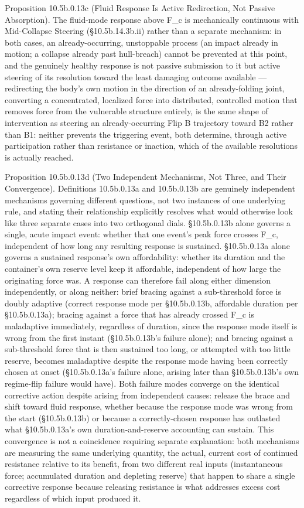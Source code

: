 \documentclass[
]{article}
\begin{document}
Proposition 10.5b.0.13c (Fluid Response Is Active Redirection, Not
Passive Absorption). The fluid-mode response above F\_c is mechanically
continuous with Mid-Collapse Steering (§10.5b.14.3b.ii) rather than a
separate mechanism: in both cases, an already-occurring, unstoppable
process (an impact already in motion; a collapse already past
hull-breach) cannot be prevented at this point, and the genuinely
healthy response is not passive submission to it but active steering of
its resolution toward the least damaging outcome available ---
redirecting the body's own motion in the direction of an already-folding
joint, converting a concentrated, localized force into distributed,
controlled motion that removes force from the vulnerable structure
entirely, is the same shape of intervention as steering an
already-occurring Flip B trajectory toward B2 rather than B1: neither
prevents the triggering event, both determine, through active
participation rather than resistance or inaction, which of the available
resolutions is actually reached.

Proposition 10.5b.0.13d (Two Independent Mechanisms, Not Three, and
Their Convergence). Definitions 10.5b.0.13a and 10.5b.0.13b are
genuinely independent mechanisms governing different questions, not two
instances of one underlying rule, and stating their relationship
explicitly resolves what would otherwise look like three separate cases
into two orthogonal dials. §10.5b.0.13b alone governs a single, acute
impact event: whether that one event's peak force crosses F\_c,
independent of how long any resulting response is sustained.
§10.5b.0.13a alone governs a sustained response's own affordability:
whether its duration and the container's own reserve level keep it
affordable, independent of how large the originating force was. A
response can therefore fail along either dimension independently, or
along neither: brief bracing against a sub-threshold force is doubly
adaptive (correct response mode per §10.5b.0.13b, affordable duration
per §10.5b.0.13a); bracing against a force that has already crossed F\_c
is maladaptive immediately, regardless of duration, since the response
mode itself is wrong from the first instant (§10.5b.0.13b's failure
alone); and bracing against a sub-threshold force that is then sustained
too long, or attempted with too little reserve, becomes maladaptive
despite the response mode having been correctly chosen at onset
(§10.5b.0.13a's failure alone, arising later than §10.5b.0.13b's own
regime-flip failure would have). Both failure modes converge on the
identical corrective action despite arising from independent causes:
release the brace and shift toward fluid response, whether because the
response mode was wrong from the start (§10.5b.0.13b) or because a
correctly-chosen response has outlasted what §10.5b.0.13a's own
duration-and-reserve accounting can sustain. This convergence is not a
coincidence requiring separate explanation: both mechanisms are
measuring the same underlying quantity, the actual, current cost of
continued resistance relative to its benefit, from two different real
inputs (instantaneous force; accumulated duration and depleting reserve)
that happen to share a single corrective response because releasing
resistance is what addresses excess cost regardless of which input
produced it.
\end{document}
